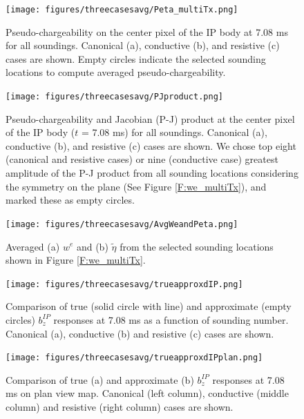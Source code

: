 \documentclass[a4paper, 11pt]{article}
\newcommand{\peta}{\tilde{\eta}}
\begin{document}
\begin{figure}[htb]
  \centering  \texttt{[image: figures/threecasesavg/Peta\_multiTx.png]}
  \caption{Pseudo-chargeability on the center pixel of the IP body at 7.08 ms for all soundings. Canonical (a), conductive (b), and resistive (c) cases are shown. Empty circles indicate the selected sounding locations to compute averaged pseudo-chargeability.}
  \label{F:Peta_multiTx}
\end{figure}
\begin{figure}[htb]
  \centering  \texttt{[image: figures/threecasesavg/PJproduct.png]}
  \caption{Pseudo-chargeability and Jacobian (P-J) product at the center pixel of the IP body ($t$ = 7.08 ms) for all soundings. Canonical (a), conductive (b), and resistive (c) cases are shown. We chose top eight (canonical and resistive cases) or nine (conductive case) greatest amplitude of the P-J product from all sounding locations considering the symmetry on the plane (See Figure \ref{F:we_multiTx}), and marked these as empty circles. }
  \label{F:PJproduct}
\end{figure}

\begin{figure}[htb]
  \centering \texttt{[image: figures/threecasesavg/AvgWeandPeta.png]}
  \caption{Averaged (a) $w^e$ and (b) $\peta$ from the selected sounding locations shown in Figure \ref{F:we_multiTx}.}
  \label{F:AvgWeandPeta}
\end{figure}

\begin{figure}[htb]
  \centering \texttt{[image: figures/threecasesavg/trueapproxdIP.png]}
  \caption{Comparison of true (solid circle with line) and approximate (empty circles) $b_z^{IP}$ responses at 7.08 ms as a function of sounding number. Canonical (a), conductive (b) and resistive (c) cases are shown. }
  \label{F:trueapproxdIP}
\end{figure}

\begin{figure}[htb]
  \centering \texttt{[image: figures/threecasesavg/trueapproxdIPplan.png]}
  \caption{Comparison of true (a) and approximate (b) $b_z^{IP}$ responses at 7.08 ms on plan view map. Canonical (left column), conductive (middle column) and resistive (right column) cases are shown.}
  \label{F:trueapproxdIPplan}
\end{figure}
\clearpage
\cite{}
\end{document}
